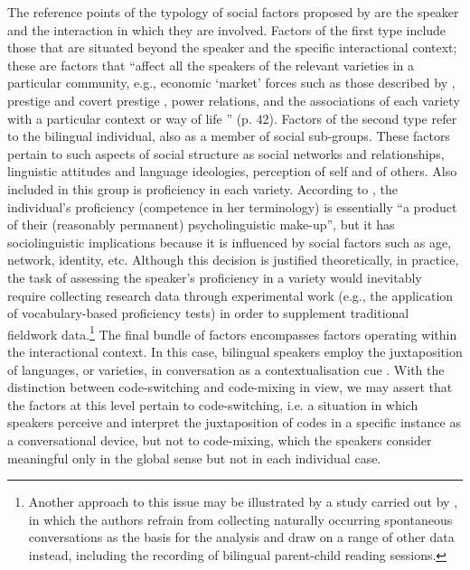 The reference points of the typology of social factors proposed by \citet[][42--43]{gardner-chloros_code-switching_2009} are the speaker and the interaction in which they are involved. Factors of the first type include those that are situated beyond the speaker and the specific interactional context; these are factors that ``affect all the speakers of the relevant varieties in a particular community, e.g., economic `market' forces such as those described by \citet{bourdieu-91}, prestige and covert prestige \citep{labov-72,trudgill-74}, power relations, and the  associations of each variety with a particular context or way of life \citep{gal-79}'' (p. 42). Factors of the second type refer to the bilingual individual, also as a member of social sub-groups. These factors pertain to such aspects of social structure as social networks and relationships, linguistic attitudes and language ideologies, perception of self and of  others. Also included in this group is proficiency in each variety. According to \citeauthor{gardner-chloros_code-switching_2009}, the individual's proficiency (competence in her terminology) is essentially ``a product of their (reasonably permanent) psycholinguistic make-up'', but it has sociolinguistic implications because it is influenced by social factors such as age, network, identity, etc. Although this decision is justified theoretically, in practice, the task of assessing the speaker's proficiency in a variety would inevitably require collecting research data through experimental work (e.g., the application of vocabulary-based proficiency tests) in order to supplement traditional fieldwork data.\footnote{Another approach to this issue may be illustrated by a study carried out by  \citet{muysken-etal96}, in which the authors refrain from collecting naturally occurring spontaneous conversations as the basis for the analysis and draw on a range of other data instead, including the recording of bilingual parent-child reading sessions.} The final bundle of factors encompasses factors operating within the interactional context. In this case, bilingual speakers employ the juxtaposition of languages, or varieties, in conversation as a contextualisation cue \citep[see e.g., the papers in][]{auer-98}. With the distinction between code-switching and code-mixing in view, we may assert that the factors at this level pertain to code-switching, i.e. a situation in which speakers perceive and interpret the juxtaposition of codes in a specific instance as a conversational device, but not to code-mixing, which the speakers consider meaningful only in the global sense but not in each individual case. 

